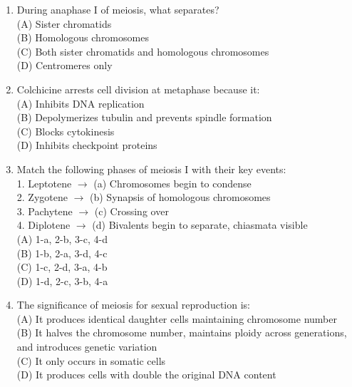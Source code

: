 \documentclass{article}
\begin{document}
\begin{enumerate}[label=Q\arabic*.]
\item During anaphase I of meiosis, what separates?
\\(A) Sister chromatids
\\(B) Homologous chromosomes
\\(C) Both sister chromatids and homologous chromosomes
\\(D) Centromeres only

\item Colchicine arrests cell division at metaphase because it:
\\(A) Inhibits DNA replication
\\(B) Depolymerizes tubulin and prevents spindle formation
\\(C) Blocks cytokinesis
\\(D) Inhibits checkpoint proteins

\item Match the following phases of meiosis I with their key events:\\
1. Leptotene $\rightarrow$ (a) Chromosomes begin to condense\\
2. Zygotene $\rightarrow$ (b) Synapsis of homologous chromosomes\\
3. Pachytene $\rightarrow$ (c) Crossing over\\
4. Diplotene $\rightarrow$ (d) Bivalents begin to separate, chiasmata visible
\\(A) 1-a, 2-b, 3-c, 4-d
\\(B) 1-b, 2-a, 3-d, 4-c
\\(C) 1-c, 2-d, 3-a, 4-b
\\(D) 1-d, 2-c, 3-b, 4-a

\item The significance of meiosis for sexual reproduction is:
\\(A) It produces identical daughter cells maintaining chromosome number
\\(B) It halves the chromosome number, maintains ploidy across generations, and introduces genetic variation
\\(C) It only occurs in somatic cells
\\(D) It produces cells with double the original DNA content

\end{enumerate}
\end{document}
